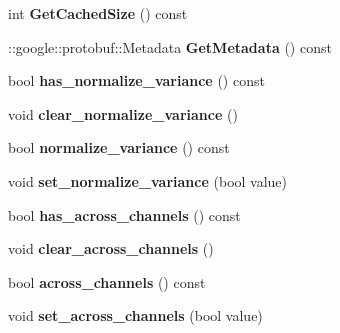 \begin{DoxyCompactItemize}
int {\bfseries Get\+Cached\+Size} () const
\item 
\mbox{\label{classcaffe_1_1_m_v_n_parameter_aa0faf2ff9b9e3e689aa898bed361d861}} 
\+::google\+::protobuf\+::\+Metadata {\bfseries Get\+Metadata} () const
\item 
\mbox{\label{classcaffe_1_1_m_v_n_parameter_a361a05178ee7f72bac32eecb505ae040}} 
bool {\bfseries has\+\_\+normalize\+\_\+variance} () const
\item 
\mbox{\label{classcaffe_1_1_m_v_n_parameter_abe1f21974c878537041003f1b4a109c4}} 
void {\bfseries clear\+\_\+normalize\+\_\+variance} ()
\item 
\mbox{\label{classcaffe_1_1_m_v_n_parameter_a0892102b8897ec98139d32c5f3edb0b2}} 
bool {\bfseries normalize\+\_\+variance} () const
\item 
\mbox{\label{classcaffe_1_1_m_v_n_parameter_ae2b2f383b225a893e9b7da730fa069ea}} 
void {\bfseries set\+\_\+normalize\+\_\+variance} (bool value)
\item 
\mbox{\label{classcaffe_1_1_m_v_n_parameter_a7f1eea902742a35a4358dafe9b591fd1}} 
bool {\bfseries has\+\_\+across\+\_\+channels} () const
\item 
\mbox{\label{classcaffe_1_1_m_v_n_parameter_ac6957c7df5f1a9237ea2e2774e7a6bda}} 
void {\bfseries clear\+\_\+across\+\_\+channels} ()
\item 
\mbox{\label{classcaffe_1_1_m_v_n_parameter_a4a16f7f04a586345f73a25ed7b8acebf}} 
bool {\bfseries across\+\_\+channels} () const
\item 
\mbox{\label{classcaffe_1_1_m_v_n_parameter_a54f1bdc63ea884d8ec31c229156861f8}} 
void {\bfseries set\+\_\+across\+\_\+channels} (bool value)
\item 
\mbox{\label{classcaffe_1_1_m_v_n_parameter_a59c55afb12d985714571ccdf100fc066}} 

\end{DoxyCompactItemize}
